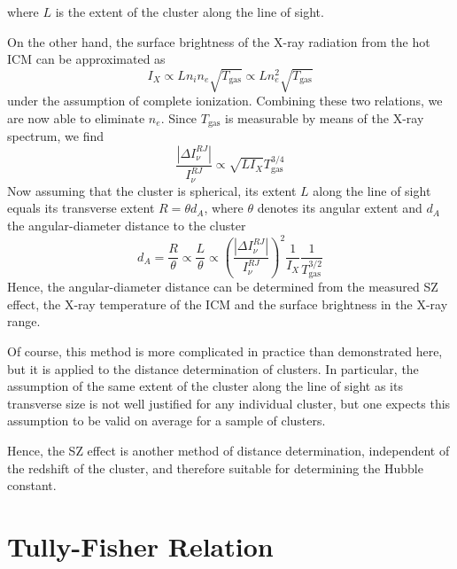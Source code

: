 where $L$  is the extent of the cluster along the line of sight.
\par On the other hand, the surface brightness of the X-ray radiation from the hot ICM can be approximated as
\begin{equation*}
    I_{X} \propto Ln_{i}n_{e}\sqrt{T_{\text{gas}}}\propto Ln_{e}^{2}\sqrt{T_{\text{gas}}}
\end{equation*}
under the assumption of complete ionization. Combining these two relations, we are now able to eliminate $n_{e}$. Since $T_{\text{gas}}$
is measurable by means of the X-ray spectrum, we find
\begin{equation*}
    \frac{|\Delta I_{\nu}^{RJ}|}{I_{\nu}^{RJ}} \propto \sqrt{LI_{X}}T_{\text{gas}}^{3/4}
\end{equation*}
Now assuming that the cluster is spherical, its extent $L$ along the line of sight equals its transverse extent $R=\theta d_{A}$, where $\theta$ denotes its angular extent and $d_{A}$ the angular-diameter distance to the cluster
\begin{equation*}
    d_{A}=\frac{R}{\theta}\propto\frac{L}{\theta}\propto\left(\frac{|\Delta I_{\nu}^{RJ}|}{I_{\nu}^{RJ}}\right)^{2}\frac{1}{I_{X}}\frac{1}{T_{\text{gas}}^{3/2}}
\end{equation*}
Hence, the angular-diameter distance can be determined from the measured SZ effect, the X-ray temperature of the ICM and the surface brightness in the X-ray range.
\par Of course, this method is more complicated in practice than demonstrated here, but it is applied to the distance determination of clusters. In particular, the assumption of the same extent of the cluster along the line of sight as its transverse size is not well justified for any individual cluster, but one expects this assumption to be valid on average for a sample of clusters.
\par Hence, the SZ effect is another method of distance determination, independent of the redshift of the cluster, and therefore suitable for determining the Hubble constant.

\section{Tully-Fisher Relation}

